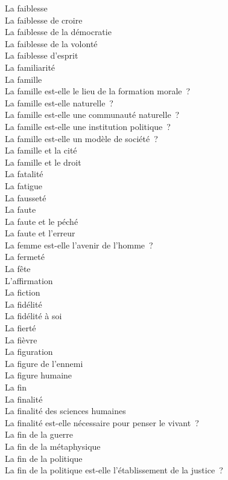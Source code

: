 \documentclass[a4paper,12pt]{article}
\begin{document}
La faiblesse \\
La faiblesse de croire \\
La faiblesse de la démocratie \\
La faiblesse de la volonté \\
La faiblesse d'esprit \\
La familiarité \\
La famille \\
La famille est-elle le lieu de la formation morale ? \\
La famille est-elle naturelle ? \\
La famille est-elle une communauté naturelle ? \\
La famille est-elle une institution politique ? \\
La famille est-elle un modèle de société ? \\
La famille et la cité \\
La famille et le droit \\
La fatalité \\
La fatigue \\
La fausseté \\
La faute \\
La faute et le péché \\
La faute et l'erreur \\
La femme est-elle l'avenir de l'homme ? \\
La fermeté \\
La fête \\
L'affirmation \\
La fiction \\
La fidélité \\
La fidélité à soi \\
La fierté \\
La fièvre \\
La figuration \\
La figure de l'ennemi \\
La figure humaine \\
La fin \\
La finalité \\
La finalité des sciences humaines \\
La finalité est-elle nécessaire pour penser le vivant ? \\
La fin de la guerre \\
La fin de la métaphysique \\
La fin de la politique \\
La fin de la politique est-elle l'établissement de la justice ? \\
\end{document}
